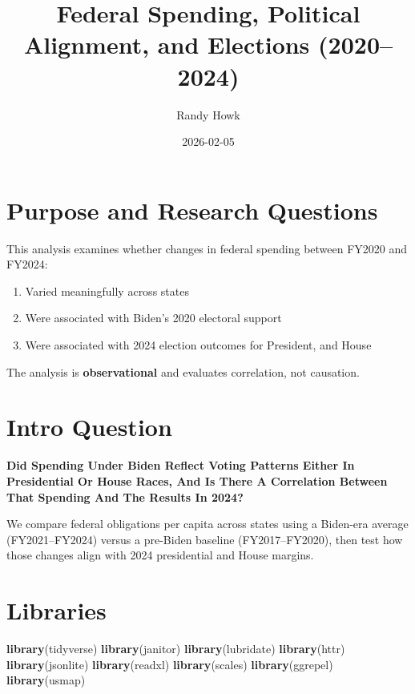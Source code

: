 \documentclass[
  11pt,
]{article}
\title{Federal Spending, Political Alignment, and Elections
(2020--2024)}
\author{Randy Howk}
\date{2026-02-05}
\newenvironment{Shaded}{\begin{snugshade}}{\end{snugshade}}
\newcommand{\FunctionTok}[1]{\textcolor[rgb]{0.13,0.29,0.53}{\textbf{#1}}}
\newcommand{\NormalTok}[1]{#1}
\providecommand{\tightlist}{%
  \setlength{\itemsep}{0pt}\setlength{\parskip}{0pt}}
\begin{document}
\maketitle

{
\setcounter{tocdepth}{2}
\tableofcontents
}
\section{Purpose and Research
Questions}\label{purpose-and-research-questions}

This analysis examines whether changes in federal spending between
FY2020 and FY2024:

\begin{enumerate}
\def\labelenumi{\arabic{enumi}.}
\tightlist
\item
  Varied meaningfully across states\\
\item
  Were associated with Biden's 2020 electoral support\\
\item
  Were associated with 2024 election outcomes for President, and House
\end{enumerate}

The analysis is \textbf{observational} and evaluates correlation, not
causation.

\section{Intro Question}\label{intro-question}

\textbf{Did Spending Under Biden Reflect Voting Patterns Either In
Presidential Or House Races, And Is There A Correlation Between That
Spending And The Results In 2024?}

We compare federal obligations per capita across states using a
Biden-era average (FY2021--FY2024) versus a pre-Biden baseline
(FY2017--FY2020), then test how those changes align with 2024
presidential and House margins.

\section{Libraries}\label{libraries}

\begin{Shaded}
\begin{Highlighting}[]
\FunctionTok{library}\NormalTok{(tidyverse)}
\FunctionTok{library}\NormalTok{(janitor)}
\FunctionTok{library}\NormalTok{(lubridate)}
\FunctionTok{library}\NormalTok{(httr)}
\FunctionTok{library}\NormalTok{(jsonlite)}
\FunctionTok{library}\NormalTok{(readxl)}
\FunctionTok{library}\NormalTok{(scales)}
\FunctionTok{library}\NormalTok{(ggrepel)}
\FunctionTok{library}\NormalTok{(usmap)}
\end{Highlighting}
\end{Shaded}
\end{document}

